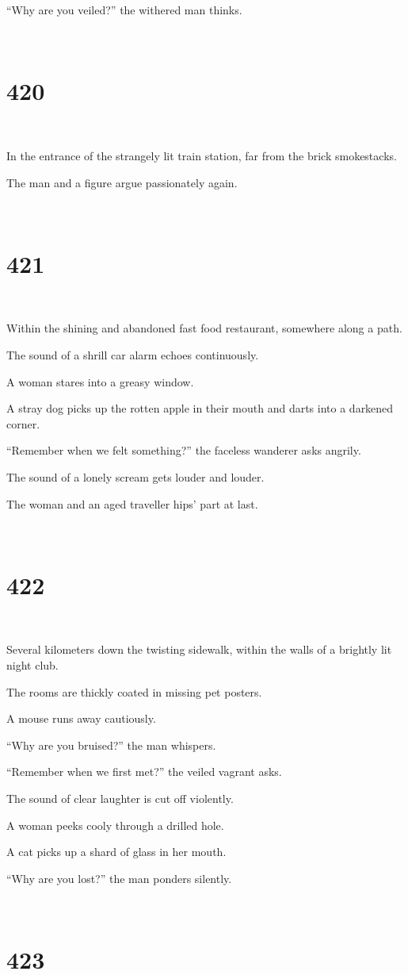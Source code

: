 \documentclass{report}
\begin{document}
``Why are you veiled?'' the withered man thinks.

~
\chapter*{420}
~

In the entrance of the strangely lit train station, far from the brick smokestacks.

The man and a figure argue passionately again.

~
\chapter*{421}
~

Within the shining and abandoned fast food restaurant, somewhere along a path.

The sound of a shrill car alarm echoes continuously.

A woman stares into a greasy window.

A stray dog picks up the rotten apple in their mouth and darts into a darkened corner.

``Remember when we felt something?'' the faceless wanderer asks angrily.

The sound of a lonely scream gets louder and louder.

The woman and an aged traveller hips' part at last.

~
\chapter*{422}
~

Several kilometers down the twisting sidewalk, within the walls of a brightly lit night club.

The rooms are thickly coated in missing pet posters.

A mouse runs away cautiously.

``Why are you bruised?'' the man whispers.

``Remember when we first met?'' the veiled vagrant asks.

The sound of clear laughter is cut off violently.

A woman peeks cooly through a drilled hole.

A cat picks up a shard of glass in her mouth.

``Why are you lost?'' the man ponders silently.

~
\chapter*{423}
~
\end{document}
